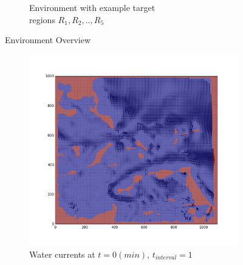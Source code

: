 \documentclass{tamuccthesis}
\begin{document}
\begin{figure}
\begin{subfigure}[b]{0.475\textwidth}
        \caption[]{{\small Environment with example target \\ regions $R_1, R_2, .., R_5$}}   
        \label{fig:env_targets}
    \end{subfigure}
    \caption[]{\small Environment Overview } 
    \label{fig:env}
\end{figure}

\begin{figure}
    \captionsetup{justification=centering}
    \centering
    \begin{subfigure}[b]{0.475\textwidth}
        \centering
        \includegraphics[width=\textwidth,trim={3cm 3cm 3cm 3cm},clip]{Fig_currentsMap-1.png}
        \caption[]{{\small Water currents at $t = 0 (min)$, $t_{interval} = 1$}}    
        \label{fig:currents_interval_1}
    \end{subfigure}
    \hfill
    \begin{subfigure}[b]{0.475\textwidth}  
        \centering 

\end{subfigure}
\end{figure}
\end{document}
